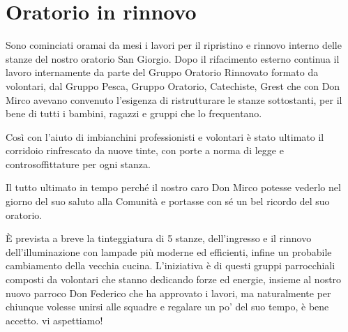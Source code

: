 \section{Oratorio in rinnovo}

Sono cominciati oramai da mesi i lavori per il ripristino e rinnovo interno delle stanze del nostro oratorio San Giorgio. Dopo il rifacimento esterno continua il lavoro internamente da parte del Gruppo Oratorio Rinnovato formato da volontari, dal Gruppo Pesca, Gruppo Oratorio, Catechiste, Grest che con Don Mirco avevano convenuto l’esigenza di ristrutturare le stanze sottostanti, per il bene di tutti i bambini, ragazzi e gruppi che lo frequentano.

Così con l’aiuto di imbianchini professionisti e volontari è stato ultimato il corridoio rinfrescato da nuove tinte, con porte a norma di legge e controsoffittature per ogni stanza.

Il tutto ultimato in tempo perché il nostro caro Don Mirco potesse vederlo nel giorno del suo saluto alla Comunità e portasse con sé un bel ricordo del suo oratorio.

È prevista a breve la tinteggiatura di 5 stanze, dell’ingresso e il rinnovo dell’illuminazione con lampade più moderne ed efficienti, infine un probabile cambiamento della vecchia cucina. L’iniziativa è di questi gruppi parrocchiali composti da volontari che stanno dedicando forze ed energie, insieme al nostro nuovo parroco Don Federico che ha approvato i lavori, ma naturalmente per chiunque volesse unirsi alle squadre e regalare un po’ del suo tempo, è bene accetto. vi aspettiamo!



